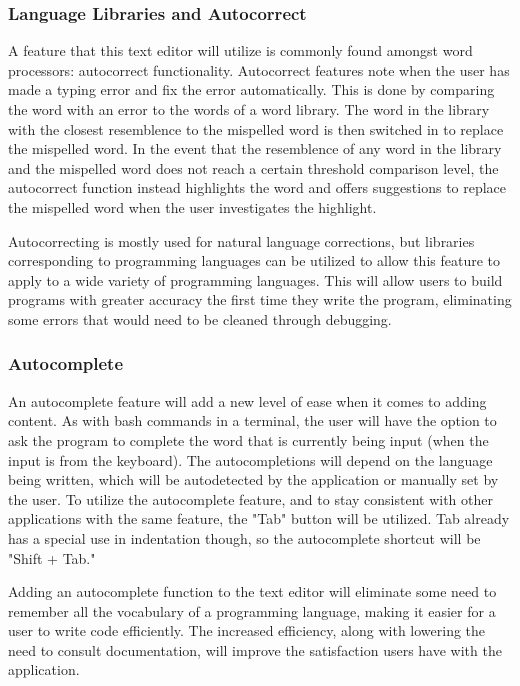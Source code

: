 \documentclass[11pt, oneside]{article}
\begin{document}
\subsubsection{Language Libraries and Autocorrect}
A feature that this text editor will utilize is commonly found amongst word processors: autocorrect functionality. Autocorrect features note when the user has made a typing error and fix the error automatically. This is done by comparing the word with an error to the words of a word library. The word in the library with the closest resemblence to the mispelled word is then switched in to replace the mispelled word. In the event that the resemblence of any word in the library and the mispelled word does not reach a certain threshold comparison level, the autocorrect function instead highlights the word and offers suggestions to replace the mispelled word when the user investigates the highlight. 

Autocorrecting is mostly used for natural language corrections, but libraries corresponding to programming languages can be utilized to allow this feature to apply to a wide variety of programming languages. This will allow users to build programs with greater accuracy the first time they write the program, eliminating some errors that would need to be cleaned through debugging. 

\subsubsection{Autocomplete}
An autocomplete feature will add a new level of ease when it comes to adding content. As with bash commands in a terminal, the user will have the option to ask the program to complete the word that is currently being input (when the input is from the keyboard). The autocompletions will depend on the language being written, which will be autodetected by the application or manually set by the user. To utilize the autocomplete feature, and to stay consistent with other applications with the same feature, the "Tab" button will be utilized. Tab already has a special use in indentation though, so the autocomplete shortcut will be "Shift + Tab."

Adding an autocomplete function to the text editor will eliminate some need to remember all the vocabulary of a programming language, making it easier for a user to write code efficiently. The increased efficiency, along with lowering the need to consult documentation, will improve the satisfaction users have with the application. 
\end{document}
